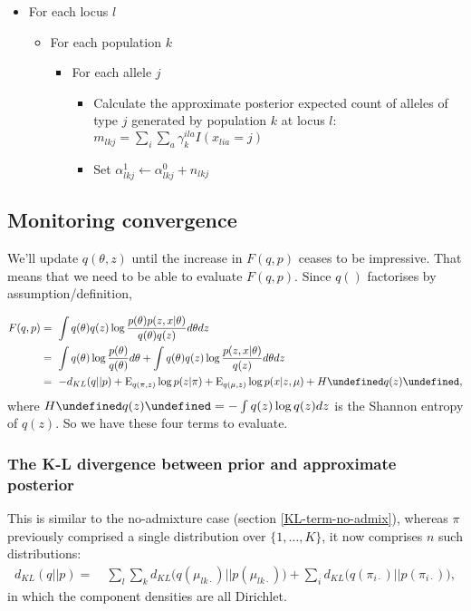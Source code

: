 \documentclass[12pt,a4paper,reqno]{article}
\newcommand{\E}{\text{E}{}}
\let\(\undefined
\let\)\undefined
\newcommand{\(}{\left(}
\newcommand{\)}{\right)}
\newcommand{\|}{\arrowvert}
\begin{document}
\begin{itemize}
\item For each locus $l$
  \begin{itemize}
  \item For each population $k$
    \begin{itemize}
    \item For each allele $j$
      \begin{itemize}
      \item Calculate the approximate posterior expected count of alleles of type $j$ generated by population $k$ at locus $l$: $m_{lkj} = \sum_{i} \sum_{a}\gamma^{ila}_{k}I(x_{lia}=j)$
      \item Set $\alpha^{1}_{lkj} \leftarrow \alpha^{0}_{lkj} + n_{lkj}$
      \end{itemize}
    \end{itemize}
  \end{itemize}
\end{itemize}

\subsection{Monitoring convergence}
We'll update $q(\theta,z)$ until the increase in $F(q,p)$ ceases to be impressive. That means that we need to be able to evaluate $F(q,p)$. Since $q()$ factorises by assumption/definition,

\begin{align*}
  F(q,p) 
&=~ \int q(\theta)q(z)\log \frac{p(\theta)p(z,x|\theta)}{q(\theta)q(z)} d\theta dz\\
&=~ \int q(\theta)\log \frac{p(\theta)}{q(\theta)} d\theta + \int q(\theta)q(z)\log \frac{p(z,x|\theta)}{q(z)} d\theta dz\\
&=~ -d_{KL}(q||p) + \E_{q(\pi,z)}\log p(z|\pi) + \E_{q(\mu,z)} \log p(x|z,\mu) + H\(q(z)\),\\
\end{align*}
where $H\(q(z)\) = -\int q(z)\log q(z) dz$ is the Shannon entropy of $q(z)$. So we have these four terms to evaluate.

\subsubsection{The K-L divergence between prior and approximate posterior}
This is similar to the no-admixture case (section \ref{KL-term-no-admix}), whereas $\pi$ previously comprised a single distribution over $\{1,\ldots,K\}$, it now comprises $n$ such distributions:
\begin{align*}
  d_{KL}(q||p)
  =&~ \sum_{l} \sum_{k} d_{KL}\Big(q(\mu_{lk\cdot})||p(\mu_{lk\cdot})\Big) + \sum_{i} d_{KL}\Big(q(\pi_{i\cdot})||p(\pi_{i\cdot})\Big),
   \end{align*}
in which the component densities are all Dirichlet. 
\end{document}
